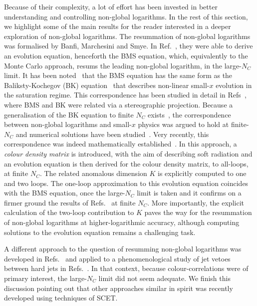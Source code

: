Because of their complexity, a lot of effort has been invested in better
understanding and controlling non-global logarithms. In the rest of
this section, we highlight some of the main results for the reader
interested in a deeper exploration of non-global logarithms.
%
The resummation of non-global logarithms was formalised by Banfi, Marchesini and Smye. In Ref.~\cite{Banfi:2002hw}, they were able to derive an evolution equation, henceforth the BMS equation, which, equivalently to the Monte Carlo approach, resums the leading non-global logarithm, in the large-$N_C$ limit. 
%
It has been noted~\cite{Marchesini:2003nh} that the BMS equation has the same form as the Baliksty-Kochegov (BK) equation~\cite{Balitsky:1995ub,Kovchegov:1999yj} that describes non-linear small-$x$ evolution in the saturation regime. This correspondence has been studied in detail in Refs~\cite{Avsar:2009yb,Hatta:2009nd}, where BMS and BK were related via a stereographic projection. Because a generalisation of the BK equation to finite $N_C$ exists~\cite{JalilianMarian:1997gr,Iancu:2000hn}, the correspondence between non-global logarithms and small-$x$ physics was argued to hold at finite-$N_C$ and numerical solutions have been studied~\cite{Weigert:2003mm,Hatta:2013iba}. Very recently, this correspondence was indeed mathematically established~\cite{Caron-Huot:2015bja}. 
%
In this approach, a \emph{colour density matrix} is introduced, with the aim of describing soft radiation and an evolution equation is then derived for the colour density matrix, to all-loops, at finite $N_C$. The related anomalous dimension $K$ is  explicitly computed to one and two loops. The one-loop approximation to this evolution equation coincides with the BMS equation, once the large-$N_C$ limit is taken and it confirms on a firmer ground the results of Refs.~\cite{Weigert:2003mm,Hatta:2013iba} at finite $N_C$. More importantly, the explicit calculation of the two-loop contribution to $K$ paves the way for the resummation of non-global logarithms at higher-logarithmic accuracy, although computing solutions to the evolution equation remains a challenging task.


A different approach to the question of resumming non-global logarithms was developed in Refs.~\cite{Forshaw:2006fk,Forshaw:2008cq,Martinez:2018ffw} and applied to a phenomenological study of jet vetoes between hard jets in Refs.~\cite{Forshaw:2009fz,Delgado:2011tp}. In that context, because colour-correlations were of primary interest, the large-$N_C$ limit did not seem adequate.
%
We finish this discussion pointing out that other approaches similar in spirit was recently developed using techniques of SCET.~\cite{Larkoski:2015zka,Larkoski:2016zzc,Becher:2015hka,Becher:2016mmh,Balsiger:2019tne}


